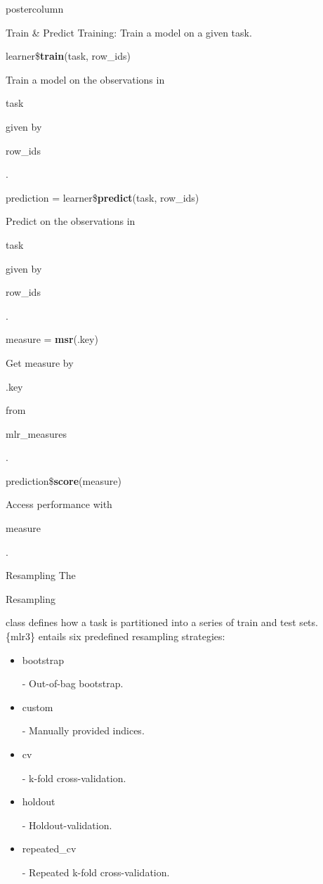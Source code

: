 \documentclass{beamer}
\newlength{\columnheight} %
\newcommand{\codeinline}[1]{\begin{codeboxinline}#1\end{codeboxinline}}
\begin{document}
\begin{frame}[fragile]{}
\begin{columns}
\begin{column}{.245\textwidth}
		\end{column}
		\begin{column}{.245\textwidth}
			\begin{beamercolorbox}[center]{postercolumn}
				\begin{minipage}{.98\textwidth}
					\parbox[t][\columnheight]{\textwidth}{
						\begin{myblock}{Train \& Predict}
							Training: Train a model on a given task.
							\vspace{1em}
							\\
							\begin{codebox}
								learner\$\textbf{train}(task, row\_ids)
							\end{codebox}
							Train a model on the observations in \codeinline{task} given by \codeinline{row\_ids}.
							\\
							\begin{codebox}
								prediction = learner\$\textbf{predict}(task, row\_ids)
							\end{codebox}
							Predict on the observations in \codeinline{task} given by \codeinline{row\_ids}.
							\\
							\vspace{1em}
							\begin{codebox}
								measure = \textbf{msr}(.key)
							\end{codebox}
							Get measure by \codeinline{.key} from \codeinline{mlr\_measures}.
							\\
							\begin{codebox}
								prediction\$\textbf{score}(measure)
							\end{codebox}
							Access performance with \codeinline{measure}.
						\end{myblock}
						\begin{myblock}{Resampling}
						The \codeinline{Resampling} class defines how a task is
						partitioned into a series of train and test sets. \{mlr3\}
						entails six predefined resampling strategies:
						\\
						\begin{itemize}
							\item \codeinline{bootstrap} - Out-of-bag bootstrap.
							\item \codeinline{custom} - Manually provided indices.
							\item \codeinline{cv} - k-fold cross-validation.
							\item \codeinline{holdout} - Holdout-validation.
							\item \codeinline{repeated\_cv} - Repeated k-fold cross-validation.

\end{itemize}
\end{myblock}}
\end{minipage}
\end{beamercolorbox}
\end{column}
\end{columns}
\end{frame}
\end{document}
